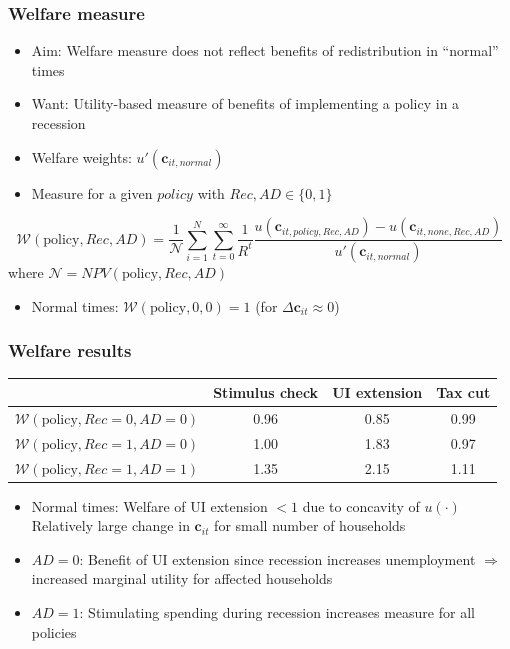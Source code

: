 \documentclass[pdflatex,aspectratio=169]{beamer}
\begin{document}
\begin{frame}
  \frametitle{Welfare measure}
  \begin{itemize}[<+->]
    \item
          Aim: Welfare measure does not reflect benefits of redistribution in ``normal'' times
    \item
          Want: Utility-based measure of benefits of implementing a policy in a recession
    \item
          Welfare weights: $u'(\mathbf{c}_{it,\textit{normal}})$
    \item
          Measure for a given $policy$ with $Rec,AD\in\{0,1\}$
  \end{itemize}

  \begin{equation*}
    \mathcal{W}(\text{policy},Rec,AD) =\frac{1}{\mathcal{N}} \sum_{i=1}^{N} \sum_{t=0}^{\infty} \frac{1}{R^t} \frac{u(\mathbf{c}_{it,\textit{policy},Rec,AD}) - u(\mathbf{c}_{it,\textit{none},Rec,AD})}{ u'(\mathbf{c}_{it,\textit{normal}})}
  \end{equation*}
  where $\mathcal{N} = NPV(\text{policy},Rec,AD)$

  \begin{itemize}[<+->]
    \item
          Normal times: $\mathcal{W}(\text{policy},0,0) = 1$ (for $\Delta \mathbf{c}_{it}\approx 0$)
  \end{itemize}
\end{frame}

\begin{frame}
  \frametitle{Welfare results}
  \centering
  \begin{tabular}
    {@{}lccc@{}}
    \hline
                                              & Stimulus check & UI extension & Tax cut \\  \hline
    $\mathcal{W}(\text{policy}, Rec=0, AD=0)$ & 0.96           & 0.85         & 0.99    \\
    $\mathcal{W}(\text{policy}, Rec=1, AD=0)$ & 1.00           & 1.83         & 0.97    \\
    $\mathcal{W}(\text{policy}, Rec=1, AD=1)$ & 1.35           & 2.15         & 1.11    \\ \hline
  \end{tabular}
  \medskip
  \begin{itemize}[<+->]
    \itemsep = .75\bigskipamount
    \item
          Normal times: Welfare of UI extension $< 1$ due to concavity of $u(\cdot)$ \\[1ex]
          Relatively large change in $\mathbf{c}_{it}$ for small number of households
    \item
          $AD=0$: Benefit of UI extension since recession increases unemployment $\Rightarrow$ increased marginal utility for affected households
    \item
          $AD=1$: Stimulating spending during recession increases measure for all policies
  \end{itemize}
\end{frame}
\end{document}
